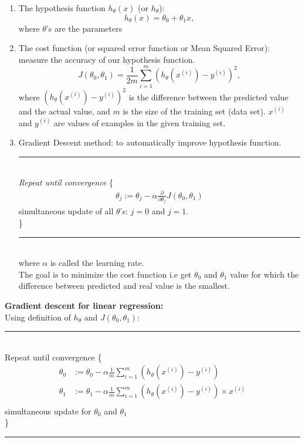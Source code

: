 \documentclass[a4paper,12pt]{report}
\begin{document}
\begin{enumerate}
\item The hypothesis function $h_{\theta}(x)$ (or $h_{\theta}$):
\begin{equation}
		\label{hypo} h_{\theta} (x) = \theta_0 + \theta_1 x,
\end{equation}
where $\theta$'s are the parameters

\item The cost function (or squared error function or Mean Squared Error): measure the accuracy of our hypothesis function.
\begin{equation}
		\label{errfn} J(\theta_0, \theta_1) = \frac{1}{2m} \sum _{i=1} ^{m} \left(h_{\theta}(x^{(i)}) -y^{(i)} \right)^2,
\end{equation}
where $\left(h_{\theta}(x^{(i)}) -y^{(i)} \right)^2$ is the difference between the predicted value and the actual value, and $m$ is the size of the training set (data set). $x^{(i)}$ and $y^{(i)}$ are values of examples in the given training set.

\item Gradient Descent method: to automatically improve hypothesis function.\\
\noindent\rule{18cm}{0.4pt}\\
\textit{Repeat until convergence} \{
\begin{align*}
		\label{graddesc} \theta_j := \theta_j - \alpha \frac{\partial}{\partial \theta_j} J(\theta_0, \theta_1)
\end{align*}
simultaneous update of all $\theta$'s: $j=0$ and $j=1$. \\
\} \\
\noindent\rule{18cm}{0.4pt}\\

where $\alpha$ is called the learning rate. \\
The goal is to minimize the cost function i.e get $\theta_0$ and $\theta_1$ value for which the difference between predicted and real value is the smallest.\\
\end{enumerate}
\textbf{Gradient descent for linear regression:} \\
Using definition of $h_{\theta}$ and $J(\theta_0, \theta_1)$: \\
\noindent\rule{18cm}{0.4pt}\\
Repeat until convergence \{
\begin{align*}
		 \theta_0 & := \theta_0 - \alpha \frac{1}{m} \sum _{i=1} ^m \left(h_{\theta}(x^{(i)}) - y^{(i)} \right) \\
		 \theta_1 &:= \theta_1 - \alpha \frac{1}{m} \sum _{i=1} ^m \left(h_{\theta}(x^{(i)}) - y^{(i)} \right) \times x^{(i)} \\
\end{align*}
simultaneous update for $\theta_0$ and $\theta_1$ \\
\} \\
\noindent\rule{18cm}{0.4pt}
\end{document}
